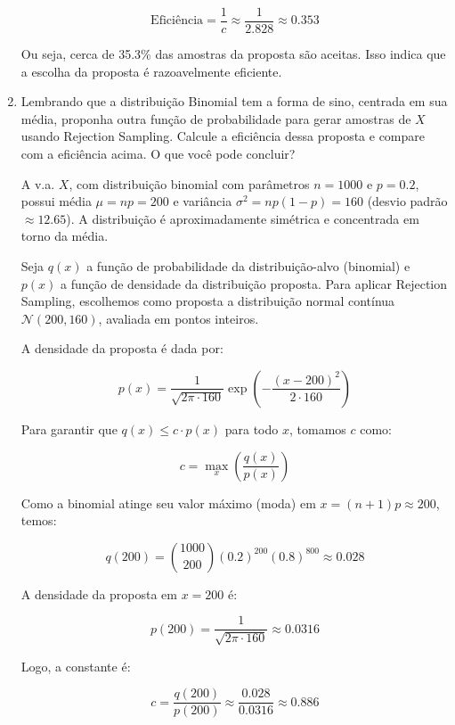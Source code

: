 \documentclass[12 pt]{article}
\begin{document}
\begin{enumerate}
\begin{tcolorbox}[colframe=black, title=Resposta:]
        $$
        \text{Eficiência} = \frac{1}{c} \approx \frac{1}{2.828} \approx 0.353
        $$
        
        Ou seja, cerca de 35.3\% das amostras da proposta são aceitas. Isso indica que a escolha da proposta é razoavelmente eficiente.
        \end{tcolorbox}
    \newpage
    \item Lembrando que a distribuição Binomial tem a forma de sino, centrada em sua média, proponha outra função de probabilidade para gerar amostras de $X$ usando Rejection Sampling. Calcule a eficiência dessa proposta e compare com a eficiência acima. O que você pode concluir?
    \begin{tcolorbox}[colframe=black, title=Resposta:]
        A v.a. $X$, com distribuição binomial com parâmetros $n = 1000$ e $p = 0.2$, possui média $\mu = np = 200$ e variância $\sigma^2 = np(1 - p) = 160$ (desvio padrão $\approx 12.65$). A distribuição é aproximadamente simétrica e concentrada em torno da média.
        
        Seja $q(x)$ a função de probabilidade da distribuição-alvo (binomial) e $p(x)$ a função de densidade da distribuição proposta. Para aplicar Rejection Sampling, escolhemos como proposta a distribuição normal contínua $\mathcal{N}(200, 160)$, avaliada em pontos inteiros.
        
        A densidade da proposta é dada por:
        
        $$
        p(x) = \frac{1}{\sqrt{2\pi \cdot 160}} \exp\left( -\frac{(x - 200)^2}{2 \cdot 160} \right)
        $$
        
        Para garantir que $q(x) \leq c \cdot p(x)$ para todo $x$, tomamos $c$ como:
        
        $$
        c = \max_x \left( \frac{q(x)}{p(x)} \right)
        $$
        
        Como a binomial atinge seu valor máximo (moda) em $x = (n+1)p \approx 200$, temos:
        
        $$
        q(200) = \binom{1000}{200} (0.2)^{200} (0.8)^{800} \approx 0.028
        $$
        
        A densidade da proposta em $x = 200$ é:
        
        $$
        p(200) = \frac{1}{\sqrt{2\pi \cdot 160}} \approx 0.0316
        $$
        
        Logo, a constante é:
        
        $$
        c = \frac{q(200)}{p(200)} \approx \frac{0.028}{0.0316} \approx 0.886
        $$
        

\end{tcolorbox}
\end{enumerate}
\end{document}
